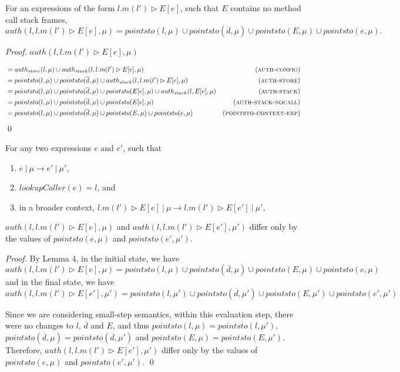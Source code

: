 \documentclass{llncs}
\begin{document}
\newpage
\begin{lemma}
For an expressions of the form $l.m(l') \rhd E[e]$, such that $E$ contains no method call stack frames,
\[
auth(l, l.m(l') \rhd E[e], \mu) = pointsto(l, \mu) \cup pointsto(\overline{d}, \mu) \cup pointsto(E, \mu) \cup pointsto(e, \mu).
\]
\end{lemma}

\begin{proof} $auth(l, l.m(l') \rhd E[e], \mu)$

\vspace{-17pt}

\begin{align*}
&= auth_{store}(l, \mu) \cup auth_{stack}(l, l.m(l') \rhd E[e], \mu) & (\textsc{auth-config})\\
&= pointsto(l, \mu) \cup pointsto(\overline{d}, \mu) \cup auth_{stack}(l, l.m(l') \rhd E[e], \mu) & (\textsc{auth-store})\\
&= pointsto(l, \mu) \cup pointsto(\overline{d}, \mu) \cup pointsto(E[e], \mu) \cup auth_{stack}(l, E[e], \mu) & (\textsc{auth-stack})\\
&= pointsto(l, \mu) \cup pointsto(\overline{d}, \mu) \cup pointsto(E[e], \mu) & (\textsc{auth-stack-nocall})\\
&= pointsto(l, \mu) \cup pointsto(\overline{d}, \mu) \cup pointsto(E, \mu) \cup pointsto(e, \mu) & (\textsc{pointsto-context-exp})
\end{align*}\qed

\end{proof}


\begin{lemma}
For any two expressions $e$ and $e'$, such that
\begin{enumerate}
\item $e~|~\mu \longrightarrow e'~|~\mu'$,
\item $lookupCaller(e) = l$, and
\item in a broader context, $l.m(l') \rhd E[e]~|~\mu \longrightarrow l.m(l') \rhd E[e']~|~\mu'$,
\end{enumerate}
$auth(l, l.m(l') \rhd E[e], \mu)$ and $auth(l, l.m(l') \rhd E[e'], \mu')$ differ only by the values of $pointsto(e, \mu)$ and $pointsto(e', \mu')$.
\end{lemma}

\begin{proof} By Lemma 4, in the initial state, we have
\[
auth(l, l.m(l') \rhd E[e], \mu) = pointsto(l, \mu) \cup pointsto(\overline{d}, \mu) \cup pointsto(E, \mu) \cup pointsto(e, \mu)
\]
and in the final state, we have
\[
auth(l, l.m(l') \rhd E[e'], \mu') = pointsto(l, \mu') \cup pointsto(\overline{d}, \mu') \cup pointsto(E, \mu') \cup pointsto(e', \mu')
\]

Since we are considering small-step semantics, within this evaluation step, there were no changes to $l$, $\overline{d}$ and $E$, and thus $pointsto(l, \mu) = pointsto(l, \mu')$, $pointsto(\overline{d}, \mu) = pointsto(\overline{d}, \mu')$ and $pointsto(E, \mu) = pointsto(E, \mu')$. Therefore, $auth(l, l.m(l') \rhd E[e'], \mu')$ differ only by the values of $pointsto(e, \mu)$ and $pointsto(e', \mu')$. \qed

\end{proof}
\end{document}
